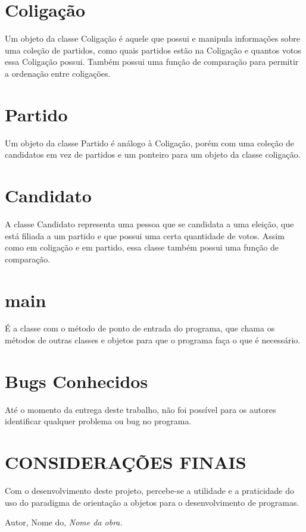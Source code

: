 \documentclass[oneside]{abntex2}
\begin{document}
	\section{Coligação}
Um objeto da classe Coligação é aquele que possui e manipula informações sobre uma coleção de partidos, como quais partidos estão na Coligação e quantos votos essa Coligação possui. Também possui uma função de comparação para permitir a ordenação entre coligações.

	\section{Partido}
Um objeto da classe Partido é análogo à Coligação, porém com uma coleção de candidatos em vez de partidos e um ponteiro para um objeto da classe coligação.

	\section{Candidato}
A classe Candidato representa uma pessoa que se candidata a uma eleição, que está filiada a um partido e que possui uma certa quantidade de votos. Assim como em coligação e em partido, essa classe também possui uma função de comparação.

	\section{main}
É a classe com o método de ponto de entrada do programa, que chama os métodos de outras classes e objetos para que o programa faça o que é necessário.

	\section{Bugs Conhecidos}
Até o momento da entrega deste trabalho, não foi possível para os autores identificar qualquer problema ou bug no programa.

    \newpage
    \section{CONSIDERAÇÕES FINAIS}
Com o desenvolvimento deste projeto, percebe-se a utilidade e a praticidade do uso do paradigma de orientação a objetos para o desenvolvimento de programas.


	\begin{thebibliography}{5}
	 Autor, Nome do, \textit{Nome da obra.}
	\end{thebibliography}
\end{document}
